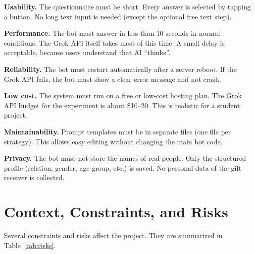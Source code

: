 \textbf{Usability.} The questionnaire must be short. Every answer is selected by tapping a button. No long text input is needed (except the optional free text step).

\textbf{Performance.} The bot must answer in less than 10 seconds in normal conditions. The Grok API itself takes most of this time. A small delay is acceptable, because users understand that AI ``thinks''.

\textbf{Reliability.} The bot must restart automatically after a server reboot. If the Grok API fails, the bot must show a clear error message and not crash.

\textbf{Low cost.} The system must run on a free or low-cost hosting plan. The Grok API budget for the experiment is about \$10--20. This is realistic for a student project.

\textbf{Maintainability.} Prompt templates must be in separate files (one file per strategy). This allows easy editing without changing the main bot code.

\textbf{Privacy.} The bot must not store the names of real people. Only the structured profile (relation, gender, age group, etc.) is saved. No personal data of the gift receiver is collected.

\section{Context, Constraints, and Risks}
\label{sec:risks}

Several constraints and risks affect the project. They are summarized in Table~\ref{tab:risks}.

